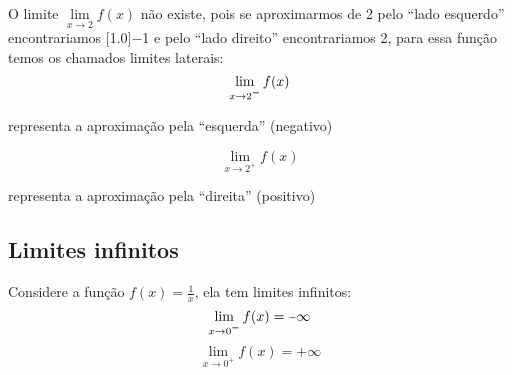 \documentclass[12pt,a4paper,brazil]{article}
\newcommand{\minus}{\scalebox{0.75}[1.0]{$-$}}
\begin{document}
O limite $\lim\limits_{x \to 2} f(x)$ não existe, pois se aproximarmos de 2 pelo ``lado esquerdo'' encontrariamos \minus1
e pelo ``lado direito'' encontrariamos 2, para essa função temos os chamados limites laterais:
\[\lim\limits_{x \to 2^{\minus}} f(x)\]
\begin{center}
	representa a aproximação pela ``esquerda'' (negativo)
\end{center}
\[\lim\limits_{x \to 2^{+}} f(x)\]
\begin{center}
	representa a aproximação pela ``direita'' (positivo)
\end{center}

\subsection{\textbf{Limites infinitos}}
Considere a função $f(x) = \frac{1}{x}$, ela tem limites infinitos:
\[\lim\limits_{x \to 0^{\minus}} f(x) = \minus\infty\]
\[\lim\limits_{x \to 0^{+}} f(x) = +\infty\]
\end{document}

